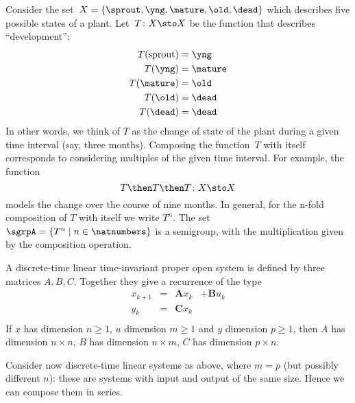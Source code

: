 \begin{example}
  \label{plant-trafo-semigroup}
  Consider the set~$X = \{ \sprout, \yng, \mature, \old, \dead \}$ which describes five possible states of a plant. Let~$T \colon X \sto X$ be the function that describes ``development'':
  \begin{align*}
    T(\text{sprout}) &=  \yng \\
    T(\yng) &=  \mature \\
    T(\mature) &=  \old \\
    T( \old) &= \dead \\
    T (\dead) &= \dead
  \end{align*}
  In other words, we think of $T$ as the change of state of the plant during a given time interval (say, three months).
  Composing the function~$T$ with itself corresponds to considering multiples of the given time interval. For example, the function
  \begin{equation*}
    T \then T \then T \colon X \sto X
  \end{equation*}
  models the change over the course of nine months. In general, for the n-fold composition of $T$ with itself we write $T^n$.
  The set~$\sgrpA = \{ T^n \mid n \in \natnumbers \}$ is a semigroup, with the multiplication given by the composition operation.
\end{example}


  \label{ex:discrete-time-linear}
  \begin{definition}
    \label{def:dicrete-time-linear-system}
    A discrete-time linear time-invariant proper open system is defined by three matrices $A,B,C$.
    Together they give a recurrence of the type
    \begin{equation} \label{eq:discrete-time-dynamics}
      \begin{aligned}
        x_{k+1} &=& \mathbf{A} x_k & + \mathbf{B} u_k \\
        y_{k}   &=& \mathbf{C} x_k  \\
      \end{aligned}
    \end{equation}
    If $x$ has dimension $n\geq1$, $u$ dimension $m\geq1$ and $y$ dimension $p\geq1$, then
    $A$ has dimension $n \times n$, $B$ has dimension $n \times m$, $C$ has dimension
    $p \times n$.
  \end{definition}

\begin{example}
  Consider now discrete-time linear systems as above, where $m=p$ (but possibly different $n$): these are systems with
  input and output of the same size. Hence we can compose them in series.




\end{example}

